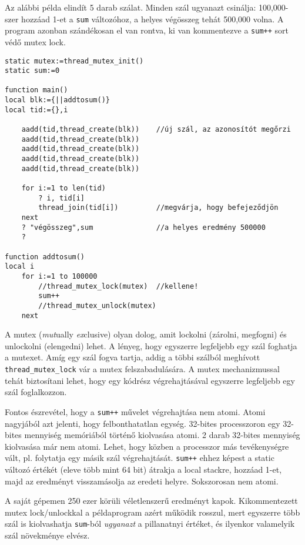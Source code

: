 Az alábbi példa elindít 5 darab szálat.
Minden szál ugyanazt csinálja: 100,000-szer hozzáad 1-et a \verb!sum! változóhoz,
a helyes végösszeg tehát 500,000 volna. A program azonban szándékosan el van rontva,
ki van kommentezve a \verb!sum++! sort védő mutex lock. 
\begin{verbatim}
static mutex:=thread_mutex_init()
static sum:=0

function main()
local blk:={||addtosum()}
local tid:={},i

    aadd(tid,thread_create(blk))    //új szál, az azonosítót megőrzi
    aadd(tid,thread_create(blk))
    aadd(tid,thread_create(blk))
    aadd(tid,thread_create(blk))
    aadd(tid,thread_create(blk))
    
    for i:=1 to len(tid)
        ? i, tid[i]
        thread_join(tid[i])         //megvárja, hogy befejeződjön
    next
    ? "végösszeg",sum               //a helyes eredmény 500000
    ?
    
function addtosum()
local i
    for i:=1 to 100000
        //thread_mutex_lock(mutex)  //kellene!
        sum++
        //thread_mutex_unlock(mutex)
    next
\end{verbatim}

A mutex ({\em mut}ually {\em ex}clusive) olyan dolog, 
amit lockolni (zárolni, megfogni) és unlockolni (elengedni) lehet.
A lényeg, hogy egyszerre legfeljebb egy szál foghatja a mutexet.
Amíg egy szál fogva tartja, 
addig a többi szálból meghívott \verb!thread_mutex_lock! vár
a mutex felszabadulására.  A mutex mechanizmussal tehát biztosítani lehet,
hogy egy kódrész végrehajtásával egyszerre legfeljebb egy szál foglalkozzon.

Fontos észrevétel, hogy a \verb!sum++! művelet végrehajtása nem atomi.
Atomi nagyjából azt jelenti, hogy felbonthatatlan egység. 32-bites processzoron
egy 32-bites mennyiség memóriából történő kiolvasása atomi. 2 darab
32-bites mennyiség kiolvasása már nem atomi. Lehet, hogy
közben a processzor más tevékenységre vált, pl. folytatja egy másik szál
végrehajtását. \verb!sum++! ehhez képest a static változó értékét 
(eleve több mint 64 bit) átrakja a local stackre, hozzáad 1-et, 
majd az eredményt visszamásolja az eredeti helyre. Sokszorosan nem atomi.

A saját gépemen 250 ezer körüli véletlenszerű eredményt kapok.
Kikommentezett mutex lock/unlockkal a példaprogram azért működik rosszul, 
mert egyszerre több szál is kiolvashatja \verb!sum!-ból {\em ugyanazt\/} 
a pillanatnyi értéket, és ilyenkor valamelyik szál növekménye elvész.


